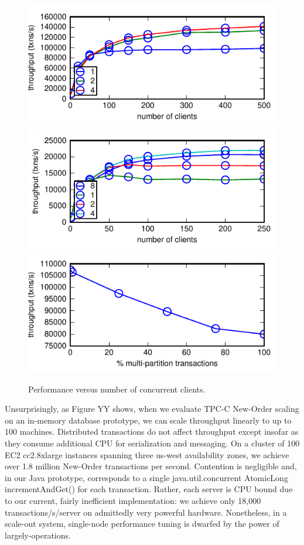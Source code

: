 \begin{figure}
\begin{center}
\includegraphics[width=\columnwidth]{figs/wh_thru.pdf}
\includegraphics[width=\columnwidth]{figs/wh_thru_single.pdf}
\includegraphics[width=\columnwidth]{figs/pct_thru.pdf}
\end{center}
\caption{Performance versus number of concurrent clients.}
\label{fig:clients}
\end{figure}


Unsurprisingly, as Figure YY shows, when we evaluate TPC-C New-Order
scaling on an in-memory database prototype, we can scale throughput
linearly to up to 100 machines. Distributed transactions do not affect
throughput except insofar as they consume additional CPU for
serialization and messaging. On a cluster of 100 EC2 cc2.8xlarge
instances spanning three us-west availability zones, we achieve over
1.8 million New-Order transactions per second. Contention is
negligible and, in our Java prototype, corresponds to a single
java.util.concurrent AtomicLong incrementAndGet() for each
transaction. Rather, each server is CPU bound due to our current,
fairly inefficient implementation: we achieve only 18,000
transactions/s/server on admittedly very powerful
hardware. Nonetheless, in a scale-out system, single-node performance
tuning is dwarfed by the power of largely-\cfree operations.

